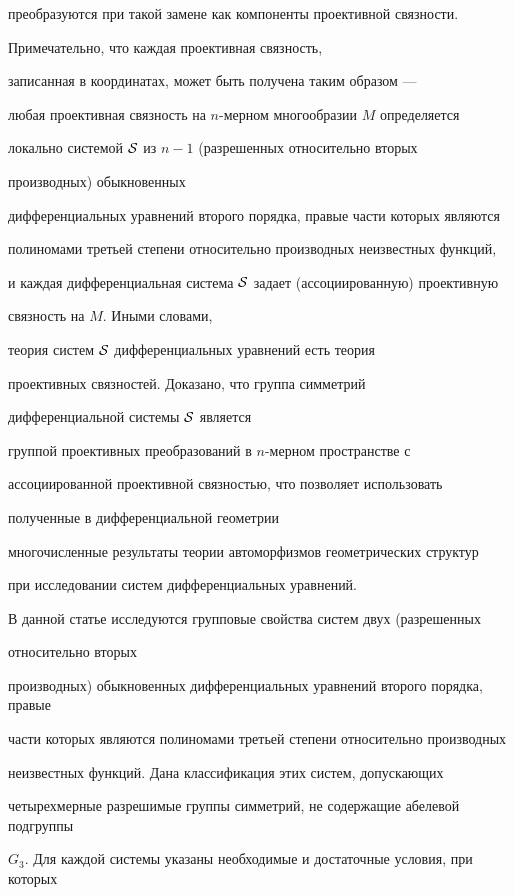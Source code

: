 преобразуются при такой замене как компоненты проективной связности.


Примечательно, что каждая проективная связность,


записанная в координатах, может быть получена таким образом ---


любая проективная связность на $n$-мерном многообразии $M$ определяется


локально системой $\cal S$ из $n-1$ (разрешенных относительно вторых 


производных) обыкновенных


дифференциальных уравнений второго порядка, правые части которых являются


полиномами третьей степени относительно производных неизвестных функций,


и каждая дифференциальная система $\cal S$ задает (ассоциированную) проективную


связность на $M$. Иными словами,


теория систем $\cal S$ дифференциальных уравнений есть теория


проективных связностей. Доказано, что группа симметрий


дифференциальной системы $\cal S$ является


группой проективных преобразований в $n$-мерном пространстве с


ассоциированной проективной связностью, что позволяет использовать


полученные в дифференциальной геометрии


многочисленные результаты теории автоморфизмов геометрических структур


при исследовании систем дифференциальных уравнений. 





В данной статье исследуются групповые свойства систем двух (разрешенных 


относительно вторых 


производных) обыкновенных дифференциальных уравнений второго порядка, правые 


части которых являются полиномами третьей степени относительно производных 


неизвестных функций. Дана классификация этих систем, допускающих 


четырехмерные разрешимые группы симметрий, не содержащие абелевой подгруппы 


$G_3$. Для каждой системы указаны необходимые и достаточные условия, при которых 


